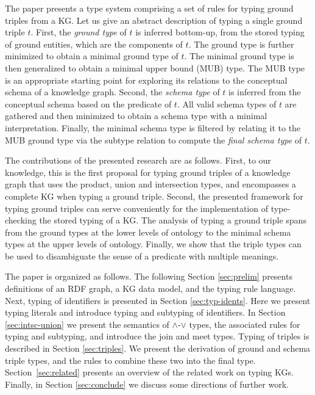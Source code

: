 \documentclass[runningheads]{llncs}
\begin{document}
The paper presents a type system comprising a set of rules for typing
ground triples from a KG. Let us give an abstract description of
typing a single ground triple $t$. First, the \emph{ground type} of
$t$ is inferred bottom-up, from the stored typing of ground
entities, which are the components of $t$. The ground type is further
minimized to obtain a minimal ground type of $t$. The minimal ground
type is then generalized to obtain a minimal upper bound (MUB)
type. The MUB type is an appropriate starting point for exploring its
relations to the conceptual schema of a knowledge graph. Second, the
\emph{schema type} of $t$ is inferred from the conceptual schema based
on the predicate of $t$. All valid schema types of $t$ are gathered
and then minimized to obtain a schema type with a minimal
interpretation. Finally, the minimal schema type is filtered by
relating it to the MUB ground type via the subtype relation to compute
the \emph{final schema type} of $t$.

The contributions of the presented research are as follows. First, to
our knowledge, this is the first proposal for typing ground triples of
a knowledge graph that uses the product, union and intersection types,
and encompasses a complete KG when typing a ground triple. Second, the
presented framework for typing ground triples can serve conveniently
for the implementation of type-checking the stored typing of a KG. The
analysis of typing a ground triple spans from the ground types at the
lower levels of ontology to the minimal schema types at the upper
levels of ontology. Finally, we show that the triple types can be used
to disambiguate the sense of a predicate with multiple meanings.

The paper is organized as follows. The following Section
\ref{sec:prelim} presents definitions of an RDF graph, a KG data model,
and the typing rule language. Next, typing of identifiers is presented
in Section \ref{sec:typ-idents}. Here we present typing literals and
introduce typing and subtyping of identifiers. In Section
\ref{sec:intsc-union} we present the semantics of $\land$-$\lor$
types, the associated rules for typing and subtyping, and introduce
the join and meet types. Typing of triples is described in Section
\ref{sec:triples}. We present the derivation of ground and schema
triple types, and the rules to combine these two into the final
type. Section~\ref{sec:related} presents an overview of the related
work on typing KGs. Finally, in Section \ref{sec:conclude} we discuss
some directions of further work. 
\end{document}
